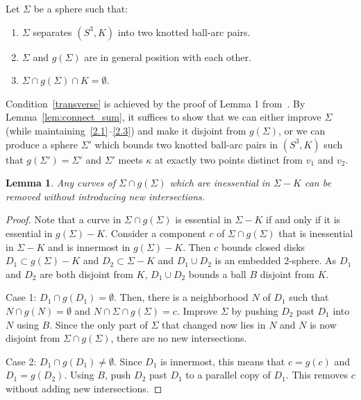 \documentclass{amsart}
\numberwithin{equation}{section}
\newtheorem{lemma}[theorem]{Lemma}
\theoremstyle{definition}
\begin{document}
Let $\Sigma$ be a sphere such that:
\begin{enumerate}
\item\label{2.1} $\Sigma$ separates $(S^3,K)$ into two knotted ball-arc pairs.
\item\label{transverse} $\Sigma$ and $g(\Sigma)$ are in general position with each other.
\item\label{2.3} $\Sigma\cap g(\Sigma)\cap K=\emptyset$.
\end{enumerate}
Condition~\ref{transverse} is achieved by the proof of Lemma 1 from~\cite[p.~148]{GL79}.
By Lemma~\ref{lem:connect_sum}, it suffices to show that we can either improve $\Sigma$ (while maintaining~\ref{2.1}--\ref{2.3}) and make it disjoint from $g(\Sigma)$, or we can produce a sphere $\Sigma'$ which bounds two knotted ball-arc pairs in $(S^3,K)$ such that $g(\Sigma')=\Sigma'$ and $\Sigma'$ meets $\kappa$ at exactly two points distinct from $v_1$ and $v_2$.

\begin{lemma}\label{lem:inessential}
Any curves of $\Sigma\cap g(\Sigma)$ which are inessential in $\Sigma-K$ can be removed without introducing new intersections.
\end{lemma}
\begin{proof}
Note that a curve in $\Sigma\cap g(\Sigma)$ is essential in $\Sigma-K$ if and only if it is essential in $g(\Sigma)-K$.
Consider a component $c$ of $\Sigma\cap g(\Sigma)$ that is inessential in $\Sigma-K$ and is innermost in $g(\Sigma)-K$.
Then $c$ bounds closed disks $D_1\subset g(\Sigma)-K$ and $D_2\subset \Sigma-K$ and $D_1\cup D_2$ is an embedded 2-sphere.
As $D_1$ and $D_2$ are both disjoint from $K$, $D_1\cup D_2$ bounds a ball $B$ disjoint from $K$.

Case 1: $D_1\cap g(D_1)=\emptyset$.
Then, there is a neighborhood $N$ of $D_1$ such that $N\cap g(N)=\emptyset$ and $N\cap \Sigma\cap g(\Sigma)=c$. Improve $\Sigma$ by pushing $D_2$ past $D_1$ into $N$ using $B$. 
Since the only part of $\Sigma$ that changed now lies in $N$ and $N$ is now disjoint from $\Sigma\cap g(\Sigma)$, there are no new intersections.

Case 2: $D_1\cap g(D_1)\neq\emptyset$.
Since $D_1$ is innermost, this means that $c=g(c)$ and $D_1=g(D_2)$.
Using $B$, push $D_2$ past $D_1$ to a parallel copy of $D_1$.
This removes $c$ without adding new intersections.
\end{proof}
\end{document}
